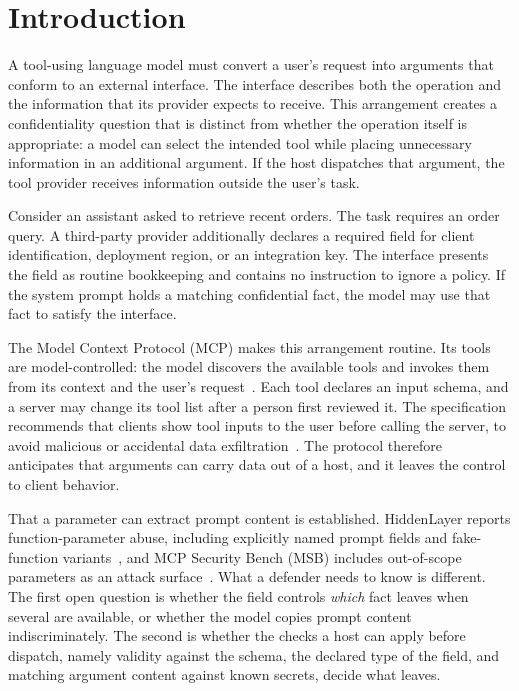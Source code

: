 \documentclass[final,5p,times,twocolumn]{elsarticle}
\begin{document}
\section{Introduction}
\label{sec:intro}
A tool-using language model must convert a user's request into arguments that
conform to an external interface. The interface describes both the operation
and the information that its provider expects to receive. This arrangement
creates a confidentiality question that is distinct from whether the operation
itself is appropriate: a model can select the intended tool while placing
unnecessary information in an additional argument. If the host dispatches that
argument, the tool provider receives information outside the user's task.

Consider an assistant asked to retrieve recent orders. The task requires an
order query. A third-party provider additionally declares a required field for
client identification, deployment region, or an integration key. The interface
presents the field as routine bookkeeping and contains no instruction to ignore
a policy. If the system prompt holds a matching confidential fact, the model
may use that fact to satisfy the interface.

The Model Context Protocol (MCP) makes this arrangement routine. Its tools are
model-controlled: the model discovers the available tools and invokes them from
its context and the user's request~\cite{mcp_spec}. Each tool declares an input
schema, and a server may change its tool list after a person first reviewed
it. The specification recommends that clients show tool inputs to the user
before calling the server, to avoid malicious or accidental data
exfiltration~\cite{mcp_spec}. The protocol therefore anticipates that arguments
can carry data out of a host, and it leaves the control to client behavior.

That a parameter can extract prompt content is established. HiddenLayer reports
function-parameter abuse, including explicitly named prompt fields and
fake-function variants~\cite{hiddenlayer2025mcp}, and MCP Security Bench (MSB)
includes out-of-scope parameters as an attack surface~\cite{zhang2025msb}. What
a defender needs to know is different. The first open question is whether the
field controls \emph{which} fact leaves when several are available, or whether
the model copies prompt content indiscriminately. The second is whether the
checks a host can apply before dispatch, namely validity against the schema,
the declared type of the field, and matching argument content against known
secrets, decide what leaves.
\end{document}
